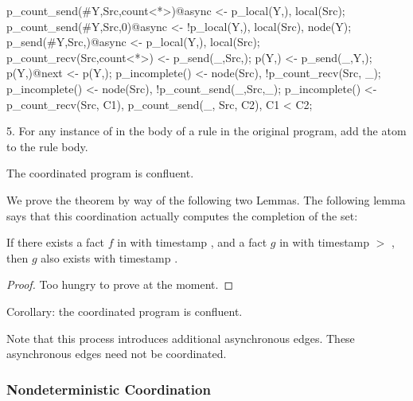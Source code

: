 \noindent
\begin{Dedalus}
p_count_send(#Y,Src,count<*>)@async <- p_local(Y,),
                                       local(Src);
p_count_send(#Y,Src,0)@async <- !p_local(Y,\dbar{_}), local(Src),
                                node(Y);
p_send(#Y,Src,)@async <- p_local(Y,), local(Src);
p_count_recv(Src,count<*>) <- p_send(_,Src,);
p(Y,) <- p_send(_,Y,);
p(Y,)@next <- p(Y,);
p_incomplete() <- node(Src), !p_count_recv(Src, _);
p_incomplete() <- node(Src), !p_count_send(_,Src,_);
p_incomplete() <- p_count_recv(Src, C1),
                  p_count_send(_, Src, C2), C1 < C2;
\end{Dedalus}

5. For any instance of  in the body of a rule in the original program, add the atom  to the rule body.

\begin{theorem}
The coordinated program is confluent.
\end{theorem}

We prove the theorem by way of the following two Lemmas.
The following lemma says that this coordination actually computes the completion of the set:

\begin{lemma}
If there exists a fact $f$ in  with timestamp , and a fact $g$ in  with timestamp  $>$ , then $g$ also exists with timestamp .
\end{lemma}
\begin{proof}
Too hungry to prove at the moment.
\end{proof}

Corollary: the coordinated program is confluent.

Note that this process introduces additional asynchronous edges.  These asynchronous edges need not be coordinated. 


\subsubsection{Nondeterministic Coordination}

